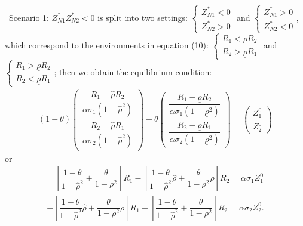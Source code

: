 \documentclass[10pt]{article}
\begin{document}
\quad \ 
Scenario 1: $ Z_{N 1}^* Z_{N 2}^* < 0 $ is split into two settings: $ \left\{ \begin{matrix} Z_{N 1}^* < 0 \\ Z_{N 2}^* > 0 \end{matrix} \right. $ and $ \left\{ \begin{matrix} Z_{N 1}^* > 0 \\ Z_{N 2}^* < 0 \end{matrix} \right. $, which correspond to the environments in equation (10): $ \left\{ \begin{matrix} R_1 < \underline{\rho} R_2 \\ R_2 > \underline{\rho} R_1 \end{matrix} \right. $ and $ \left\{ \begin{matrix} R_1 > \underline{\rho} R_2 \\ R_2 < \underline{\rho} R_1 \end{matrix} \right. $; then we obtain the equilibrium condition:
\begin{eqnarray}
(1 - \theta) \left( \begin{matrix} \dfrac{R_1 - \hat \rho R_2}{\alpha \sigma_1 (1 - {\hat \rho}^2)} \\ \dfrac{R_2 - \hat \rho R_1}{\alpha \sigma_2 (1 - {\hat \rho}^2)} \end{matrix} \right) + \theta \left( \begin{matrix} \dfrac{R_1 - \underline{\rho} R_2}{\alpha \sigma_1 (1 - \underline{\rho}^2)} \\ \dfrac{R_2 - \underline{\rho} R_1}{\alpha \sigma_2 (1 - \underline{\rho}^2)} \end{matrix} \right) = \left( \begin{matrix} Z_1^0 \\ Z_2^0 \end{matrix} \right)
\end{eqnarray}
or
\begin{eqnarray*}
& \quad \left[ \dfrac{1 - \theta}{1 - {\hat \rho}^2} + \dfrac{\theta}{1 - \underline{\rho}^2} \right] R_1 - \left[ \dfrac{1 - \theta}{1 - {\hat \rho}^2} {\hat \rho} + \dfrac{\theta}{1 - \underline{\rho}^2} \underline{\rho} \right] R_2 = \alpha \sigma_1 Z_1^0 & \\
& - \left[ \dfrac{1 - \theta}{1 - {\hat \rho}^2} {\hat \rho} + \dfrac{\theta}{1 - \underline{\rho}^2} \underline{\rho} \right] R_1 + \left[ \dfrac{1 - \theta}{1 - {\hat \rho}^2} + \dfrac{\theta}{1 - \underline{\rho}^2} \right] R_2 = \alpha \sigma_2 Z_2^0. & 
\end{eqnarray*}
\end{document}
